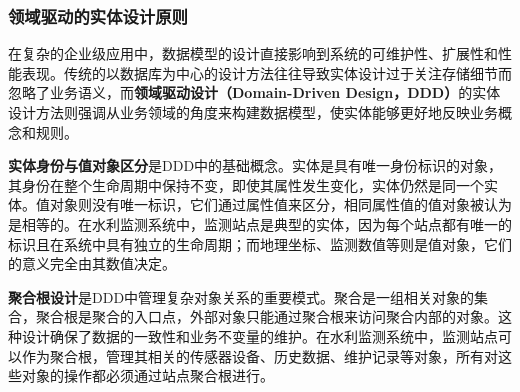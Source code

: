 \subsubsection{领域驱动的实体设计原则}\label{ux9886ux57dfux9a71ux52a8ux7684ux5b9eux4f53ux8bbeux8ba1ux539fux5219}

在复杂的企业级应用中，数据模型的设计直接影响到系统的可维护性、扩展性和性能表现。传统的以数据库为中心的设计方法往往导致实体设计过于关注存储细节而忽略了业务语义，而\textbf{领域驱动设计（Domain-Driven Design，DDD）}的实体设计方法则强调从业务领域的角度来构建数据模型，使实体能够更好地反映业务概念和规则。

\textbf{实体身份与值对象区分}是DDD中的基础概念。实体是具有唯一身份标识的对象，其身份在整个生命周期中保持不变，即使其属性发生变化，实体仍然是同一个实体。值对象则没有唯一标识，它们通过属性值来区分，相同属性值的值对象被认为是相等的。在水利监测系统中，监测站点是典型的实体，因为每个站点都有唯一的标识且在系统中具有独立的生命周期；而地理坐标、监测数值等则是值对象，它们的意义完全由其数值决定。

\textbf{聚合根设计}是DDD中管理复杂对象关系的重要模式。聚合是一组相关对象的集合，聚合根是聚合的入口点，外部对象只能通过聚合根来访问聚合内部的对象。这种设计确保了数据的一致性和业务不变量的维护。在水利监测系统中，监测站点可以作为聚合根，管理其相关的传感器设备、历史数据、维护记录等对象，所有对这些对象的操作都必须通过站点聚合根进行。

